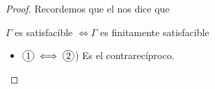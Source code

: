 \begin{proof} \phantom{.}

    Recordemos que el  nos dice que
    \begin{center}
        $\Gamma$ es satisfacible $\iff \Gamma$ es finitamente satisfacible
    \end{center}

    \begin{itemize}
        \item $\circled{1} \iff \circled{2}$) 
            Es el contrarecíproco.







                    


\end{itemize}
\end{proof}
